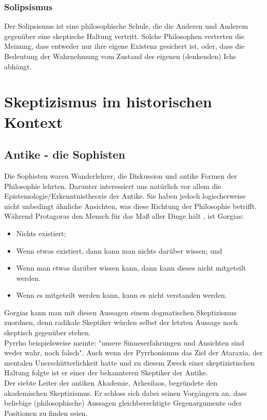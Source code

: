 \documentclass[12pt,a4paper]{article}
\begin{document}
		\subsubsection{Solipsismus}
Der Solipsismus ist eine philosophische Schule, die die Anderen und Anderem gegenüber eine skeptische Haltung vertritt. Solche Philosophen vertreten die Meinung, dass entweder nur ihre eigene Existenz gesichert ist, oder, dass die Bedeutung der Wahrnehmung vom Zustand des eigenen (denkenden) Ichs abhängt. %
\section{Skeptizismus im historischen Kontext}
	\subsection{Antike - die Sophisten}
Die Sophisten waren Wanderlehrer, die Diskussion und antike Formen der Philosophie lehrten. Darunter interessiert uns %
natürlich vor allem die Epistemologie/Erkenntnistheorie der Antike. Sie haben jedoch logischerweise nicht unbedingt ähnliche Ansichten, was diese Richtung der Philosophie betrifft. Während Protagoras den Mensch für das Maß aller Dinge hält%
, ist Gorgias:
\begin{itemize}
\item Nichts existiert;
\item Wenn etwas existiert, dann kann man nichts darüber wissen; und
\item Wenn man etwas darüber wissen kann, dann kann dieses nicht mitgeteilt werden.
\item Wenn es mitgeteilt werden kann, kann es nicht verstanden werden.
\end{itemize}%
Gorgias kann man mit diesen Aussagen einem dogmatischen Skeptizismus zuordnen, denn radikale Skeptiker würden selbst der letzten Aussage noch skeptisch gegenüber stehen.\\
Pyrrho beispielsweise meinte: "unsere Sinneserfahrungen und Ansichten sind weder wahr, noch falsch".%
 Auch wenn der Pyrrhonismus das Ziel der Ataraxia, der mentalen Unerschütterlichkeit hatte und zu diesem Zweck einer skeptizistischen Haltung folgte ist er einer der bekannteren Skeptiker der Antike.%
\\Der siebte Leiter der antiken Akademie, Arkesilaos, begründete den akademischen Skeptizismus. Er schloss sich dabei seinen Vorgängern an, dass beliebige (philosophische) Aussagen gleichberechtigte Gegenargumente oder Positionen zu finden seien.
\end{document}

